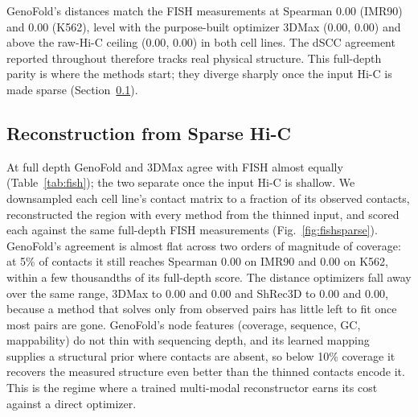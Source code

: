 \documentclass[conference]{IEEEtran}
\providecommand{\fishgeno}{0.00}
\providecommand{\fishmax}{0.00}
\providecommand{\fishanchor}{0.00}
\providecommand{\fishnseg}{0}
\providecommand{\fishgenok}{0.00}
\providecommand{\fishmaxk}{0.00}
\providecommand{\fishanchork}{0.00}
\providecommand{\sparsegenoI}{0.00}
\providecommand{\sparsemaxI}{0.00}
\providecommand{\sparseshrecI}{0.00}
\providecommand{\sparsegenoK}{0.00}
\providecommand{\sparsemaxK}{0.00}
\providecommand{\sparseshrecK}{0.00}
\begin{document}
GenoFold's distances match the FISH measurements at Spearman $\fishgeno$ (IMR90) and
$\fishgenok$ (K562), level with the purpose-built optimizer 3DMax ($\fishmax$,
$\fishmaxk$) and above the raw-Hi-C ceiling ($\fishanchor$, $\fishanchork$) in both cell
lines. The dSCC agreement reported throughout therefore tracks real physical structure.
This full-depth parity is where the methods start; they diverge sharply once the input
Hi-C is made sparse (Section~\ref{sub:sparse}).

\begin{table}[t]
\caption{Validation against \emph{measured} single-molecule distances: Spearman
correlation between reconstructed pairwise distances and the median FISH distance matrix
of Bintu et al.~\cite{bintu2018} over all \fishnseg{}-segment pairs of chromosome~21
(hg19 chr21:29.37--31.32~Mb) in two cell lines. GenoFold is mean\,$\pm$\,std over 3 seeds;
best reconstruction per cell in bold. $^{\dagger}$Raw Hi-C = input contacts as distances,
no reconstruction: the ceiling a faithful method inherits.}
\label{tab:fish}
\centering

\end{table}

\subsection{Reconstruction from Sparse Hi-C}
\label{sub:sparse}
At full depth GenoFold and 3DMax agree with FISH almost equally (Table~\ref{tab:fish});
the two separate once the input Hi-C is shallow. We downsampled each cell line's contact
matrix to a fraction of its observed contacts, reconstructed the region with every method
from the thinned input, and scored each against the same full-depth FISH measurements
(Fig.~\ref{fig:fishsparse}). GenoFold's agreement is almost flat across two orders of
magnitude of coverage: at 5\% of contacts it still reaches Spearman \sparsegenoI{} on
IMR90 and \sparsegenoK{} on K562, within a few thousandths of its full-depth score. The
distance optimizers fall away over the same range, 3DMax to \sparsemaxI{} and
\sparsemaxK{} and ShRec3D to \sparseshrecI{} and \sparseshrecK{}, because a method that
solves only from observed pairs has little left to fit once most pairs are gone.
GenoFold's node features (coverage, sequence, GC, mappability) do not thin with sequencing
depth, and its learned mapping supplies a structural prior where contacts are absent, so
below 10\% coverage it recovers the measured structure even better than the thinned
contacts encode it. This is the regime where a trained multi-modal reconstructor earns its
cost against a direct optimizer.
\end{document}
